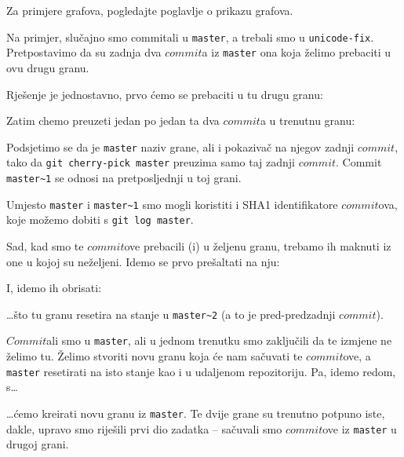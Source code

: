 Za primjere grafova, pogledajte poglavlje o prikazu grafova.


Na primjer, slučajno smo commitali u \verb+master+, a trebali smo u \verb+unicode-fix+.
Pretpostavimo da su zadnja dva $commit$a iz \verb+master+ ona koja želimo prebaciti u ovu drugu granu.

Rješenje je jednostavno, prvo ćemo se prebaciti u tu drugu granu:


Zatim chemo preuzeti jedan po jedan ta dva $commit$a u trenutnu granu:


Podsjetimo se da je \verb+master+ naziv grane, ali i pokazivač na njegov zadnji $commit$, tako da \verb+git cherry-pick master+ preuzima samo taj zadnji $commit$.
Commit \verb+master~1+ se odnosi na pretposljednji u toj grani.

Umjesto \verb+master+ i \verb+master~1+ smo mogli koristiti i SHA1 identifikatore $commit$ova, koje možemo dobiti s \verb+git log master+.

Sad, kad smo te $commit$ove prebacili (i) u željenu granu, trebamo ih maknuti iz one u kojoj su neželjeni.
Idemo se prvo prešaltati na nju:


I, idemo ih obrisati:


\dots{}što tu granu resetira na stanje u \verb+master~2+ (a to je pred-predzadnji $commit$).


$Commit$ali smo u \verb+master+, ali u jednom trenutku smo zaključili da te izmjene ne želimo tu.
Želimo stvoriti novu granu koja će nam sačuvati te $commit$ove, a \verb+master+ resetirati na isto stanje kao i u udaljenom repozitoriju.
Pa, idemo redom, s\dots


\dots{}ćemo kreirati novu granu iz \verb+master+.
Te dvije grane su trenutno potpuno iste, dakle, upravo smo riješili prvi dio zadatka -- sačuvali smo $commit$ove iz \verb+master+ u drugoj grani.


